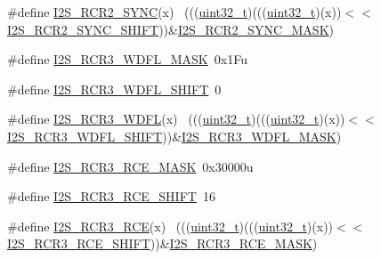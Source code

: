 \begin{DoxyCompactItemize}
\item 
\#define \hyperlink{group___i2_s___register___masks_ga24bcf66ef68374a56756bb5fbb6bc89d}{I2\+S\+\_\+\+R\+C\+R2\+\_\+\+S\+Y\+NC}(x)                                              ~(((\hyperlink{_p_e___types_8h_a33594304e786b158f3fb30289278f5af}{uint32\+\_\+t})(((\hyperlink{_p_e___types_8h_a33594304e786b158f3fb30289278f5af}{uint32\+\_\+t})(x))$<$$<$\hyperlink{group___i2_s___register___masks_ga9bb530a10a74f4c58a1866ba1d62fedd}{I2\+S\+\_\+\+R\+C\+R2\+\_\+\+S\+Y\+N\+C\+\_\+\+S\+H\+I\+FT}))\&\hyperlink{group___i2_s___register___masks_gaf1a919e7fd69cca38a1454b2883fc0f0}{I2\+S\+\_\+\+R\+C\+R2\+\_\+\+S\+Y\+N\+C\+\_\+\+M\+A\+SK})
\item 
\#define \hyperlink{group___i2_s___register___masks_gab98b46b5057b2fd18a0fefb93eb20450}{I2\+S\+\_\+\+R\+C\+R3\+\_\+\+W\+D\+F\+L\+\_\+\+M\+A\+SK}~0x1\+Fu
\item 
\#define \hyperlink{group___i2_s___register___masks_gaab28291891b0e5ced36d580cef82982d}{I2\+S\+\_\+\+R\+C\+R3\+\_\+\+W\+D\+F\+L\+\_\+\+S\+H\+I\+FT}~0
\item 
\#define \hyperlink{group___i2_s___register___masks_ga9451f98a521a64d394571a591a34add1}{I2\+S\+\_\+\+R\+C\+R3\+\_\+\+W\+D\+FL}(x)                                              ~(((\hyperlink{_p_e___types_8h_a33594304e786b158f3fb30289278f5af}{uint32\+\_\+t})(((\hyperlink{_p_e___types_8h_a33594304e786b158f3fb30289278f5af}{uint32\+\_\+t})(x))$<$$<$\hyperlink{group___i2_s___register___masks_gaab28291891b0e5ced36d580cef82982d}{I2\+S\+\_\+\+R\+C\+R3\+\_\+\+W\+D\+F\+L\+\_\+\+S\+H\+I\+FT}))\&\hyperlink{group___i2_s___register___masks_gab98b46b5057b2fd18a0fefb93eb20450}{I2\+S\+\_\+\+R\+C\+R3\+\_\+\+W\+D\+F\+L\+\_\+\+M\+A\+SK})
\item 
\#define \hyperlink{group___i2_s___register___masks_ga1609ba1986cd2320ff34a1308599c93b}{I2\+S\+\_\+\+R\+C\+R3\+\_\+\+R\+C\+E\+\_\+\+M\+A\+SK}~0x30000u
\item 
\#define \hyperlink{group___i2_s___register___masks_ga1ed5dcaaac88cd06cfc10bb290c7f097}{I2\+S\+\_\+\+R\+C\+R3\+\_\+\+R\+C\+E\+\_\+\+S\+H\+I\+FT}~16
\item 
\#define \hyperlink{group___i2_s___register___masks_ga8074c20580f401cbdb00cdf6859a7830}{I2\+S\+\_\+\+R\+C\+R3\+\_\+\+R\+CE}(x)                                                ~(((\hyperlink{_p_e___types_8h_a33594304e786b158f3fb30289278f5af}{uint32\+\_\+t})(((\hyperlink{_p_e___types_8h_a33594304e786b158f3fb30289278f5af}{uint32\+\_\+t})(x))$<$$<$\hyperlink{group___i2_s___register___masks_ga1ed5dcaaac88cd06cfc10bb290c7f097}{I2\+S\+\_\+\+R\+C\+R3\+\_\+\+R\+C\+E\+\_\+\+S\+H\+I\+FT}))\&\hyperlink{group___i2_s___register___masks_ga1609ba1986cd2320ff34a1308599c93b}{I2\+S\+\_\+\+R\+C\+R3\+\_\+\+R\+C\+E\+\_\+\+M\+A\+SK})
$$
\end{DoxyCompactItemize}

